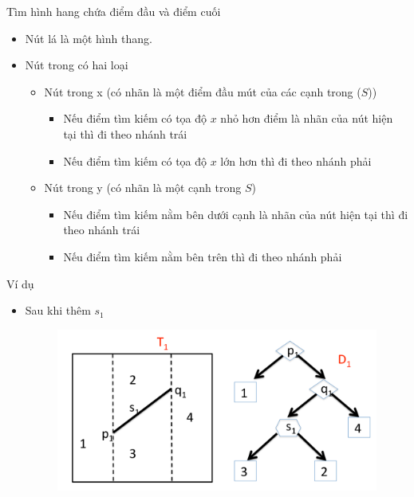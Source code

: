 \documentclass[compress]{beamer}
\begin{document}
\begin{frame}{Tìm hình hang chứa điểm đầu và điểm cuối}
 

\begin{itemize}
\item Nút lá là một hình thang.
\item Nút trong có hai loại 
\begin{itemize}
\item Nút trong x (có nhãn là một điểm đầu mút của các cạnh trong ($S$))
\begin{itemize}
\item Nếu điểm tìm kiếm có tọa độ $x$ nhỏ hơn điểm là nhãn của nút hiện tại thì đi theo nhánh trái
\item Nếu điểm tìm kiếm có tọa độ $x$ lớn hơn thì đi theo nhánh phải 
\end{itemize}
\item Nút trong y (có nhãn là một cạnh trong $S$)
\begin{itemize}
\item Nếu điểm tìm kiếm nằm bên dưới cạnh là nhãn của nút hiện tại thì đi theo nhánh trái 
\item Nếu điểm tìm kiếm nằm bên trên thì đi theo nhánh phải
\end{itemize}
\end{itemize}
\end{itemize}
 
\end{frame}

\begin{frame}{Ví dụ}
\begin{itemize}
\item Sau khi thêm $s_1$
\begin{figure}[H]
\centering
\includegraphics[scale=0.27]{tree_search.png}
\end{figure}
\end{itemize}
\end{frame}
\end{document}
